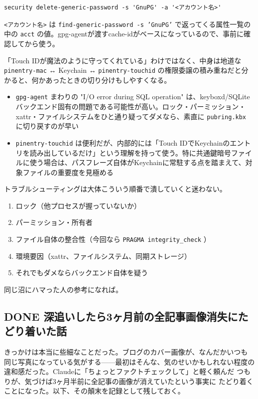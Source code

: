 \documentclass[11pt]{article}
\begin{document}
\begin{enumerate}
\begin{verbatim}
security delete-generic-password -s 'GnuPG' -a '<アカウント名>'
\end{verbatim}

\texttt{<アカウント名>} は \texttt{find-generic-password -s 'GnuPG'} で返ってくる属性一覧の中の \texttt{acct} の値。gpg-agentが渡すcache-idがベースになっているので、事前に確認してから使う。

「Touch IDが魔法のように守ってくれている」わけではなく、中身は地道な \texttt{pinentry-mac} ↔ Keychain ↔ \texttt{pinentry-touchid} の権限委譲の積み重ねだと分かると、何かあったときの切り分けもしやすくなる。



\begin{itemize}
\item \texttt{gpg-agent} まわりの "I/O error during SQL operation" は、keyboxd/SQLiteバックエンド固有の問題である可能性が高い。ロック・パーミッション・xattr・ファイルシステムをひと通り疑ってダメなら、素直に \texttt{pubring.kbx} に切り戻すのが早い
\item \texttt{pinentry-touchid} は便利だが、内部的には「Touch IDでKeychainのエントリを読み出しているだけ」という理解を持って使う。特に共通鍵暗号ファイルに使う場合は、パスフレーズ自体がKeychainに常駐する点を踏まえて、対象ファイルの重要度を見極める
\end{itemize}

トラブルシューティングは大体こういう順番で潰していくと迷わない。

\begin{enumerate}
\item ロック（他プロセスが握っていないか）
\item パーミッション・所有者
\item ファイル自体の整合性（今回なら \texttt{PRAGMA integrity\_check} ）
\item 環境要因（xattr、ファイルシステム、同期ストレージ）
\item それでもダメならバックエンド自体を疑う
\end{enumerate}

同じ沼にハマった人の参考になれば。
\end{enumerate}
\subsection{{\bfseries\sffamily DONE} 深追いしたら3ヶ月前の全記事画像消失にたどり着いた話}
\label{sec:orgfa41ef5}
きっかけは本当に些細なことだった。ブログのカバー画像が、なんだかいつも
同じ写真になっている気がする——最初はそんな、気のせいかもしれない程度の
違和感だった。Claudeに「ちょっとファクトチェックして」と軽く頼んだ
つもりが、気づけば3ヶ月半前に全記事の画像が消えていたという事実に
たどり着くことになった。以下、その顛末を記録として残しておく。
\end{document}
